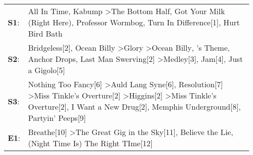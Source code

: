 \begin{supertabular}{p{0.03\textwidth}p{0.92\textwidth}}
 \textbf{S1}:  &                                                                                                                                                           All In Time\textsuperscript{}, \enspace Kabump\textsuperscript{} \textgreater \enspace The Bottom Half\textsuperscript{}, \enspace Got Your Milk (Right Here)\textsuperscript{}, \enspace Professor Wormbog\textsuperscript{}, \enspace Turn In Difference[1]\textsuperscript{}, \enspace Hurt Bird Bath\textsuperscript{}  \enspace  \\
 \textbf{S2}:  &                                         Bridgeless[2]\textsuperscript{}, \enspace Ocean Billy\textsuperscript{} \textgreater \enspace Glory\textsuperscript{} \textgreater \enspace Ocean Billy\textsuperscript{}, 's Theme\textsuperscript{}, \enspace Anchor Drops\textsuperscript{}, \enspace Last Man Swerving[2]\textsuperscript{} \textgreater \enspace Medley[3]\textsuperscript{}, \enspace Jam[4]\textsuperscript{}, \enspace Just a Gigolo[5]\textsuperscript{}  \enspace  \\
 \textbf{S3}:  &  Nothing Too Fancy[6]\textsuperscript{} \textgreater \enspace Auld Lang Syne[6]\textsuperscript{}, \enspace Resolution[7]\textsuperscript{} \textgreater \enspace Miss Tinkle's Overture[2]\textsuperscript{} \textgreater \enspace Higgins[2]\textsuperscript{} \textgreater \enspace Miss Tinkle's Overture[2]\textsuperscript{}, \enspace I Want a New Drug[2]\textsuperscript{}, \enspace Memphis Underground[8]\textsuperscript{}, \enspace Partyin' Peeps[9]\textsuperscript{}  \enspace  \\
 \textbf{E1}:  &                                                                                                                                                                                                                                                                        Breathe[10]\textsuperscript{} \textgreater \enspace The Great Gig in the Sky[11]\textsuperscript{}, \enspace Believe the Lie\textsuperscript{}, \enspace (Night Time Is) The Right TIme[12]\textsuperscript{}  \enspace  \\
\end{supertabular}
